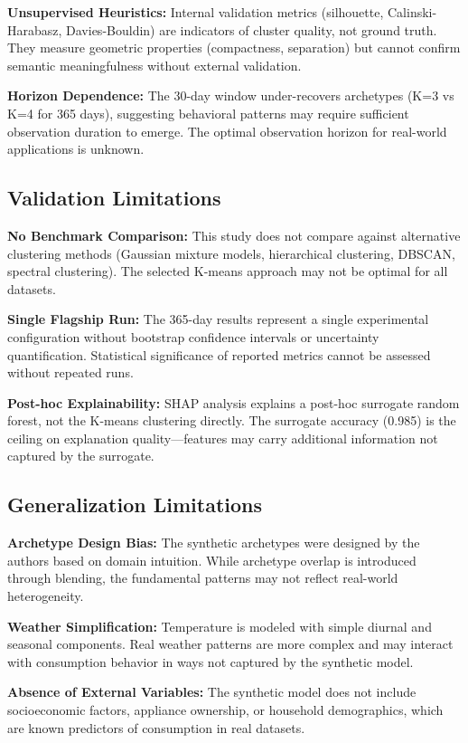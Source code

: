 \documentclass[11pt,a4paper]{article}
\begin{document}
\textbf{Unsupervised Heuristics:} Internal validation metrics (silhouette, Calinski-Harabasz, Davies-Bouldin) are indicators of cluster quality, not ground truth. They measure geometric properties (compactness, separation) but cannot confirm semantic meaningfulness without external validation.

\textbf{Horizon Dependence:} The 30-day window under-recovers archetypes (K=3 vs K=4 for 365 days), suggesting behavioral patterns may require sufficient observation duration to emerge. The optimal observation horizon for real-world applications is unknown.

\subsection{Validation Limitations}

\textbf{No Benchmark Comparison:} This study does not compare against alternative clustering methods (Gaussian mixture models, hierarchical clustering, DBSCAN, spectral clustering). The selected K-means approach may not be optimal for all datasets.

\textbf{Single Flagship Run:} The 365-day results represent a single experimental configuration without bootstrap confidence intervals or uncertainty quantification. Statistical significance of reported metrics cannot be assessed without repeated runs.

\textbf{Post-hoc Explainability:} SHAP analysis explains a post-hoc surrogate random forest, not the K-means clustering directly. The surrogate accuracy (0.985) is the ceiling on explanation quality---features may carry additional information not captured by the surrogate.

\subsection{Generalization Limitations}

\textbf{Archetype Design Bias:} The synthetic archetypes were designed by the authors based on domain intuition. While archetype overlap is introduced through blending, the fundamental patterns may not reflect real-world heterogeneity.

\textbf{Weather Simplification:} Temperature is modeled with simple diurnal and seasonal components. Real weather patterns are more complex and may interact with consumption behavior in ways not captured by the synthetic model.

\textbf{Absence of External Variables:} The synthetic model does not include socioeconomic factors, appliance ownership, or household demographics, which are known predictors of consumption in real datasets.
\end{document}
